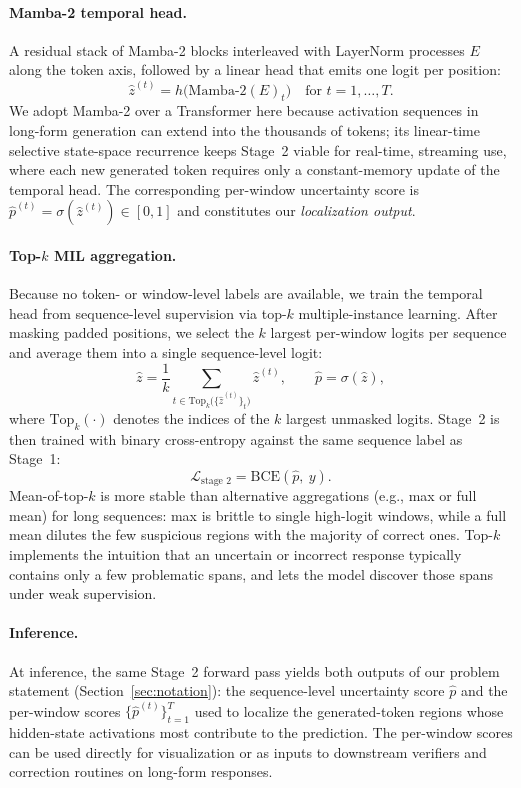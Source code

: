 \paragraph{Mamba-2 temporal head.} A residual stack of Mamba-2 blocks
\citep{albertgu2024} interleaved with LayerNorm processes $E$ along the
token axis, followed by a linear head that emits one logit per
position:
\begin{equation}
    \hat{z}^{(t)} = h\bigl(\mathrm{Mamba\text{-}2}(E)_t\bigr)
    \quad \text{for } t = 1, \dots, T.
\end{equation}
We adopt Mamba-2 over a Transformer here because activation sequences
in long-form generation can extend into the thousands of tokens; its
linear-time selective state-space recurrence keeps Stage~2 viable for
real-time, streaming use, where each new generated token requires only
a constant-memory update of the temporal head. The corresponding
per-window uncertainty score is
$\hat{p}^{(t)} = \sigma(\hat{z}^{(t)}) \in [0, 1]$ and constitutes our
\emph{localization output}.

\paragraph{Top-$k$ MIL aggregation.} Because no token- or window-level
labels are available, we train the temporal head from sequence-level
supervision via top-$k$ multiple-instance learning. After masking
padded positions, we select the $k$ largest per-window logits per
sequence and average them into a single sequence-level logit:
\begin{equation}
    \hat{z} = \frac{1}{k} \sum_{t \in \mathrm{Top}_k\bigl(\{\hat{z}^{(t)}\}_t\bigr)} \hat{z}^{(t)},
    \qquad
    \hat{p} = \sigma(\hat{z}),
\end{equation}
where $\mathrm{Top}_k(\cdot)$ denotes the indices of the $k$ largest
unmasked logits. Stage~2 is then trained with binary cross-entropy
against the same sequence label as Stage~1:
\begin{equation}
    \mathcal{L}_{\text{stage 2}} = \mathrm{BCE}(\hat{p},\ y).
\end{equation}
Mean-of-top-$k$ is more stable than alternative aggregations
(e.g., max or full mean) for long sequences: max is brittle to single
high-logit windows, while a full mean dilutes the few suspicious
regions with the majority of correct ones. Top-$k$ implements the
intuition that an uncertain or incorrect response typically contains
only a few problematic spans, and lets the model discover those spans
under weak supervision.

\paragraph{Inference.} At inference, the same Stage~2 forward pass
yields both outputs of our problem statement
(Section~\ref{sec:notation}): the sequence-level uncertainty score
$\hat{p}$ and the per-window scores $\{\hat{p}^{(t)}\}_{t=1}^{T}$ used
to localize the generated-token regions whose hidden-state activations
most contribute to the prediction. The per-window scores can be used
directly for visualization or as inputs to downstream verifiers and
correction routines on long-form responses.
